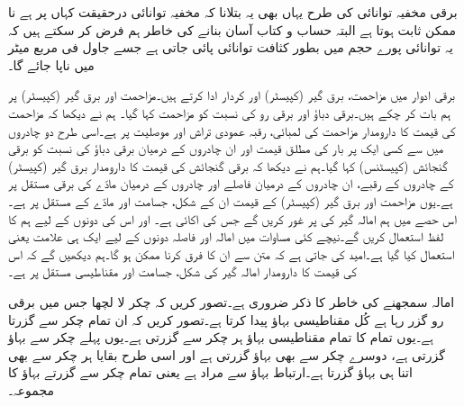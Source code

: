 برقی مخفیہ توانائی کی طرح یہاں بھی یہ بتلانا کہ مخفیہ توانائی درحقیقت کہاں پر ہے نا ممکن ثابت ہوتا ہے البتہ حساب و کتاب آسان بنانے کی خاطر ہم فرض کر سکتے ہیں کہ یہ توانائی پورے حجم میں بطور کثافت توانائی  پائی جاتی ہے جسے جاول فی مربع میٹر  میں ناپا جائے گا۔


برقی ادوار میں مزاحمت، برق گیر (کپیسٹر) اور  کردار ادا کرتے ہیں۔مزاحمت اور برق گیر (کپیسٹر) پر ہم بات کر چکے ہیں۔برقی دباؤ اور برقی رو کی نسبت  کو مزاحمت کہا گیا۔ ہم نے دیکھا کہ مزاحمت کی قیمت کا دارومدار مزاحمت کی لمبائی، رقبہ عمودی تراش اور موصلیت پر ہے۔اسی طرح دو چادروں میں سے کسی ایک پر بار کی مطلق قیمت اور ان چادروں  کے درمیان برقی دباؤ کی نسبت  کو برقی گنجائش (کپیسٹنس) کہا گیا۔ہم نے دیکھا کہ برقی گنجائش کی قیمت کا دارومدار برق گیر (کپیسٹر) کے چادروں کے رقبے، ان چادروں کے درمیان فاصلے اور چادروں کے درمیان مادّے کی برقی مستقل پر ہے۔یوں مزاحمت اور برق گیر (کپیسٹر) کے قیمت ان کے شکل، جسامت اور مادّے کے مستقل پر ہے۔اس حصے میں ہم امالہ گیر کی   پر غور کریں گے جس کی اکائی   ہے۔ اور اس کی  دونوں کے لیے ہم  کا لفظ استعمال کریں گے۔نیچے کئی مساوات میں امالہ اور فاصلہ دونوں کے لیے ایک ہی علامت یعنی  استعمال کیا گیا ہے۔امید کی جاتی ہے کہ متن سے ان کا فرق کرنا ممکن ہو گا۔ہم دیکھیں گے کہ اس کی قیمت کا دارومدار امالہ گیر کی شکل، جسامت اور مقناطیسی مستقل پر ہے۔ 

امالہ سمجھنے کی خاطر  کا ذکر ضروری ہے۔تصور کریں کہ  چکر لا لچھا جس میں  برقی رو گزر رہا ہے کُل  مقناطیسی بہاؤ پیدا کرتا ہے۔تصور کریں کہ  ان تمام  چکر سے گزرتا ہے۔یوں تمام کا تمام مقناطیسی بہاؤ ہر چکر سے گزرتی ہے۔یوں پہلے چکر سے  بہاؤ گزرتی ہے، دوسرے چکر سے بھی  بہاؤ گزرتی ہے اور اسی طرح بقایا ہر چکر سے بھی اتنا ہی بہاؤ گزرتا ہے۔ارتباط بہاؤ سے مراد  ہے یعنی تمام چکر سے گزرتے بہاؤ کا مجموعہ۔

